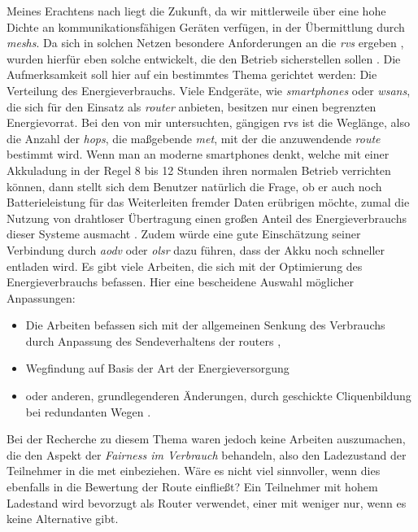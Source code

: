 Meines Erachtens nach liegt die Zukunft, da wir mittlerweile über eine hohe Dichte an kommunikationsfähigen Geräten verfügen, in der Übermittlung durch \textit{\glspl{mesh}}. Da sich in solchen Netzen besondere Anforderungen an die \textit{\glspl{rv}} ergeben \cite{RFC2501}, wurden hierfür eben solche entwickelt, die den Betrieb sicherstellen sollen \cite{Azzedine11} \cite{Kumar13}. Die Aufmerksamkeit soll hier auf ein bestimmtes Thema gerichtet werden: Die Verteilung des Energieverbrauchs. Viele Endgeräte, wie \textit{\glspl{smartphone}} oder \textit{\glspl{wsan}}, die sich für den Einsatz als \textit{\gls{router}} anbieten, besitzen nur einen begrenzten Energievorrat. Bei den von mir untersuchten, gängigen \glspl{rv} ist die Weglänge, also die Anzahl der \textit{\glspl{hop}}, die maßgebende \textit{\gls{met}}, mit der die anzuwendende \textit{\gls{route}} bestimmt wird. Wenn man an moderne \glspl{smartphone} denkt, welche mit einer Akkuladung in der Regel 8 bis 12 Stunden ihren normalen Betrieb verrichten können, dann stellt sich dem Benutzer natürlich die Frage, ob er auch noch Batterieleistung für das Weiterleiten fremder Daten erübrigen möchte, zumal die Nutzung von drahtloser Übertragung einen großen Anteil des Energieverbrauchs dieser Systeme ausmacht \cite{Tawalbeh16}\cite{Caroll10}\cite{Huang12}. Zudem würde eine gute Einschätzung seiner Verbindung durch \textit{\gls{aodv}} oder \textit{\gls{olsr}} dazu führen, dass der Akku noch schneller entladen wird. Es gibt viele Arbeiten, die sich mit der Optimierung des Energieverbrauchs befassen. Hier eine bescheidene Auswahl möglicher Anpassungen:

\begin{itemize}
\item Die Arbeiten befassen sich mit der allgemeinen Senkung des Verbrauchs durch Anpassung des Sendeverhaltens der \glspl{router} \cite{Booranawong13}\cite{Singh88},
\item Wegfindung auf Basis der Art der Energieversorgung \cite{Avudainayagam03}
\item oder anderen, grundlegenderen Änderungen, \zB durch geschickte Cliquenbildung bei redundanten Wegen \cite{Liu09}.\newline
\end{itemize}

Bei der Recherche zu diesem Thema waren jedoch keine Arbeiten auszumachen, die den Aspekt der \textit{Fairness im Verbrauch} behandeln, also den Ladezustand der Teilnehmer in die \gls{met} einbeziehen. Wäre es nicht viel sinnvoller, wenn dies ebenfalls in die Bewertung der Route einfließt? Ein Teilnehmer mit hohem Ladestand wird bevorzugt als Router verwendet, einer mit weniger nur, wenn es keine Alternative gibt. 

